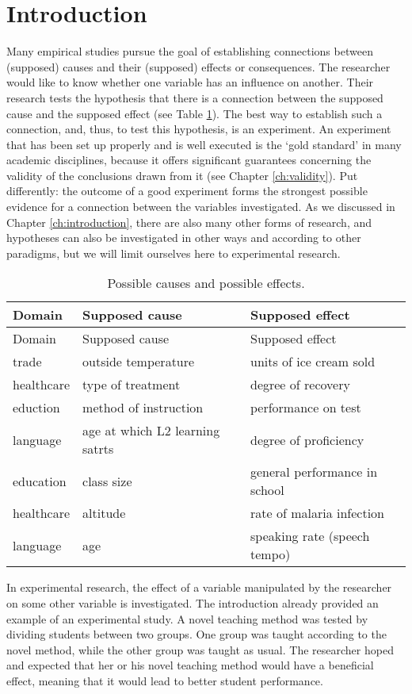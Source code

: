 \documentclass[
]{book}
\begin{document}
\hypertarget{introduction}{%
\section{Introduction}\label{introduction}}

Many empirical studies pursue the goal of establishing connections between (supposed) causes and their (supposed) effects or consequences. The researcher would like to know whether one variable has an influence on another. Their research tests the hypothesis that there is a connection between the supposed cause and the supposed effect (see Table \ref{tab:causeeffect}). The best way to establish such a connection, and, thus, to test this hypothesis, is an experiment. An experiment that has been set up properly and is well executed is the `gold standard' in many academic disciplines, because it offers significant guarantees concerning the validity of the conclusions drawn from it (see Chapter \ref{ch:validity}). Put differently: the outcome of a good experiment forms the strongest possible evidence for a connection between the variables investigated. As we discussed in Chapter \ref{ch:introduction}, there are also many other forms of research, and hypotheses can also be investigated in other ways and according to other paradigms, but we will limit ourselves here to experimental research.

\begin{longtable}[]{@{}lll@{}}
\caption{\label{tab:causeeffect} Possible causes and possible effects.}\tabularnewline
\toprule
Domain & Supposed cause & Supposed effect\tabularnewline
\midrule
\endfirsthead
\toprule
Domain & Supposed cause & Supposed effect\tabularnewline
\midrule
\endhead
trade & outside temperature & units of ice cream sold\tabularnewline
healthcare & type of treatment & degree of recovery\tabularnewline
eduction & method of instruction & performance on test\tabularnewline
language & age at which L2 learning satrts & degree of proficiency\tabularnewline
education & class size & general performance in school\tabularnewline
healthcare & altitude & rate of malaria infection\tabularnewline
language & age & speaking rate (speech tempo)\tabularnewline
\bottomrule
\end{longtable}

In experimental research, the effect of a variable manipulated by the researcher on some other variable is investigated. The introduction already provided an example of an experimental study. A novel teaching method was tested by dividing students between two groups. One group was taught according to the novel method, while the other group was taught as usual. The researcher hoped and expected that her or his novel teaching method would have a beneficial effect, meaning that it would lead to better student performance.
\end{document}
